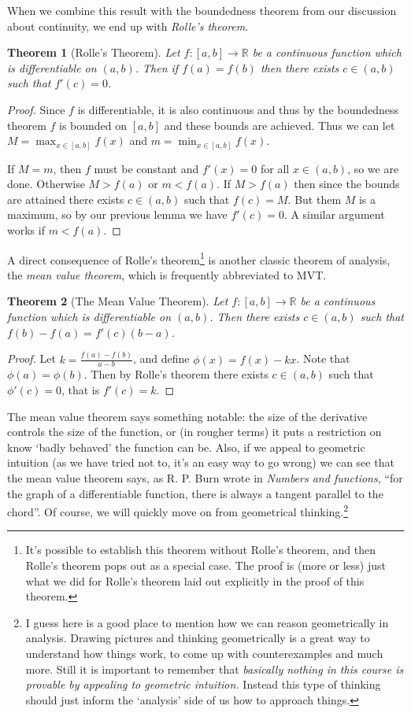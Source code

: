 \documentclass[11pt, a4paper]{article}
\newtheorem{theorem}{Theorem}[section]
\theoremstyle{definition}
\newcommand{\R}{\mathbb{R}}
\begin{document}
When we combine this result with the boundedness theorem from our discussion about continuity, we end up with \emph{Rolle's theorem}.

\begin{theorem}[Rolle's Theorem]
	Let $f: [a, b] \rightarrow \R$ be a continuous function which is differentiable on $(a, b)$. Then if $f(a) = f(b)$ then there exists $c \in (a, b)$ such that $f'(c) = 0$.
\end{theorem}
\begin{proof}
	Since $f$ is differentiable, it is also continuous and thus by the boundedness theorem $f$ is bounded on $[a, b]$ and these bounds are achieved.
	Thus we can let $M = \max_{x \in [a, b]} f(x)$ and $m = \min_{x \in [a, b]} f(x)$.

	If $M = m$, then $f$ must be constant and $f'(x) = 0$ for all $x \in (a, b)$, so we are done.
	Otherwise $M > f(a)$ or $m < f(a)$. If $M > f(a)$ then since the bounds are attained there exists $c \in (a, b)$ such that $f(c) = M$. But them $M$ is a maximum, so by our previous lemma we have $f'(c) = 0$. A similar argument works if $m < f(a)$.
\end{proof}

A direct consequence of Rolle's theorem\footnote{It's possible to establish this theorem without Rolle's theorem, and then Rolle's theorem pops out as a special case. The proof is (more or less) just what we did for Rolle's theorem laid out explicitly in the proof of this theorem.} 
is another classic theorem of analysis, the \emph{mean value theorem}, which is frequently abbreviated to MVT.

\begin{theorem}[The Mean Value Theorem]
	Let $f: [a, b] \rightarrow \R$ be a continuous function which is differentiable on $(a, b)$. Then there exists $c \in (a, b)$ such that $f(b) - f(a) = f'(c)(b - a)$.
\end{theorem}
\begin{proof}
	Let $k = \frac{f(a) - f(b)}{a - b}$, and define $\phi(x) = f(x) - kx$. Note that $\phi(a) = \phi(b)$. Then by Rolle's theorem there exists $c \in (a, b)$ such that $\phi'(c) = 0$, that is $f'(c) = k$.
\end{proof}

The mean value theorem says something notable: the size of the derivative controls the size of the function, or (in rougher terms) it puts a restriction on know `badly behaved' the function can be.
Also, if we appeal to geometric intuition (as we have tried not to, it's an easy way to go wrong) we can see that the mean value theorem says, as R. P. Burn wrote in \emph{Numbers and functions}, ``for the graph of a differentiable function, there is always a tangent parallel to the chord''. Of course, we will quickly move on from geometrical thinking.\footnote{I guess here is a good place to mention how we can reason geometrically in analysis. Drawing pictures and thinking geometrically is a great way to understand how things work, to come up with counterexamples and much more. Still it is important to remember that \emph{basically nothing in this course is provable by appealing to geometric intuition.} Instead this type of thinking should just inform the `analysis' side of us how to approach things.} 
\end{document}
